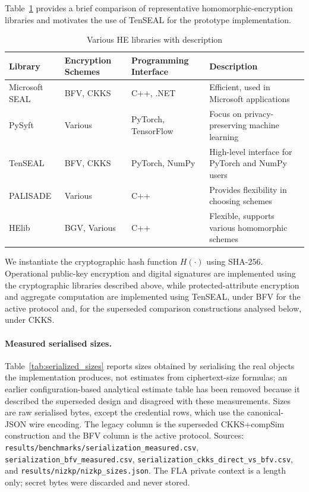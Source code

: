 \documentclass[a4paper,fleqn]{cas-dc}
\begin{document}
Table~\ref{tab:he_libraries} provides a brief comparison of representative homomorphic-encryption libraries and motivates the use of TenSEAL for the prototype implementation.

\begin{table}[htbp]
\centering
\caption{Various HE libraries with description}
\label{tab:he_libraries}
\scriptsize
\begin{tabular}{|l|l|l|l|}
\hline
\textbf{Library} & \textbf{Encryption Schemes} & \textbf{Programming Interface} & \textbf{Description} \\ \hline
Microsoft SEAL & BFV, CKKS & C++, .NET & Efficient, used in Microsoft applications \\ \hline
PySyft         & Various   & PyTorch, TensorFlow & Focus on privacy-preserving machine learning \\ \hline
TenSEAL        & BFV, CKKS & PyTorch, NumPy & High-level interface for PyTorch and NumPy users \\ \hline
PALISADE       & Various   & C++ & Provides flexibility in choosing schemes \\ \hline
HElib          & BGV, Various & C++ & Flexible, supports various homomorphic schemes \\ \hline
\end{tabular}
\end{table}



We instantiate the cryptographic hash function $H(\cdot)$ using SHA-256.
Operational public-key encryption and digital signatures are implemented
using the cryptographic libraries described above, while protected-attribute
encryption and aggregate computation are implemented using TenSEAL, under BFV
for the active protocol and, for the superseded comparison constructions
analysed below, under CKKS.

\paragraph{Measured serialised sizes.} Table~\ref{tab:serialized_sizes} reports sizes obtained by serialising the real objects the implementation produces, not estimates from ciphertext-size formulas; an earlier configuration-based analytical estimate table has been removed because it described the superseded design and disagreed with these measurements. Sizes are raw serialised bytes, except the credential rows, which use the canonical-JSON wire encoding. The legacy column is the superseded CKKS+compSim construction and the BFV column is the active protocol. Sources: \texttt{results/benchmarks/serialization\_measured.csv}, \texttt{serialization\_bfv\_measured.csv}, \texttt{serialization\_ckks\_direct\_vs\_bfv.csv}, and \texttt{results/nizkp/nizkp\_sizes.json}. The FLA private context is a length only; secret bytes were discarded and never stored.
\end{document}
